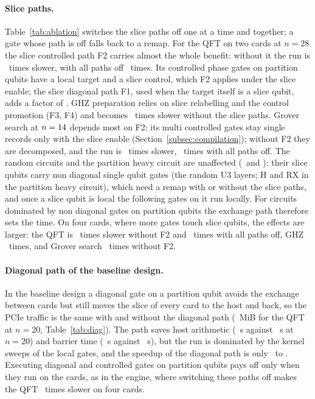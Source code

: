 \paragraph{Slice paths.} Table~\ref{tab:ablation} switches the slice paths off one at a time and together; a gate
whose path is off falls back to a remap. For the QFT on two cards at $n=28$ the slice controlled path F2 carries almost
the whole benefit: without it the run is \NumAblQftTwoFtwoOff~times slower, with all paths off \NumAblQftTwoAllOff~times.
Its controlled phase gates on partition qubits have a local target and a slice control, which F2 applies under the slice
enable; the slice diagonal path F1, used when the target itself is a slice qubit, adds a factor of \NumAblQftTwoFoneOff.
GHZ preparation relies on slice relabelling and the control promotion (F3, F4) and becomes \NumAblGhzTwoAllOff~times
slower without the slice paths. Grover search at $n=14$ depends most on F2: its multi controlled
gates stay single records only with the slice enable (Section~\ref{subsec:compilation}); without F2 they are decomposed,
and the run is \NumAblGroverTwoFtwoOff~times slower, \NumAblGroverTwoAllOff~times with all paths off. The random circuits and the partition heavy circuit are unaffected
(\NumAblRandTwoAllOff~and \NumAblPhTwoAllOff): their slice qubits carry non diagonal single qubit gates (the random
U3 layers; H and RX in the partition heavy circuit), which need a remap with or without the slice paths, and once a slice
qubit is local the following gates on it run locally. For circuits dominated by non diagonal gates on partition
qubits the exchange path therefore sets the time. On four cards, where more gates touch slice qubits, the effects are larger: the QFT is
\NumAblQftFourFtwoOff~times slower without F2 and \NumAblQftFourAllOff~times with all paths off, GHZ
\NumAblGhzFourAllOff~times, and Grover search \NumAblGroverFourFtwoOff~times without F2.

\paragraph{Diagonal path of the baseline design.} In the baseline design a diagonal gate on a partition qubit avoids
the exchange between cards but still moves the slice of every card to the host and back, so the PCIe traffic is the
same with and without the diagonal path (\NumDiagPcieTwenty~MiB for the QFT at $n=20$, Table~\ref{tab:diag}). The path
saves host arithmetic (\NumDiagHostOffTwenty~s against \NumDiagHostOnTwenty~s at $n=20$) and barrier time
(\NumDiagBarrierOffTwenty~s against \NumDiagBarrierOnTwenty~s), but the run is dominated by the kernel sweeps of the local
gates, and the speedup of the diagonal path is only \NumDiagSpeedupMin~to \NumDiagSpeedupMax. Executing diagonal and
controlled gates on partition qubits pays off only when they run on the cards, as in the engine, where switching these
paths off makes the QFT \NumAblQftFourAllOff~times slower on four cards.


